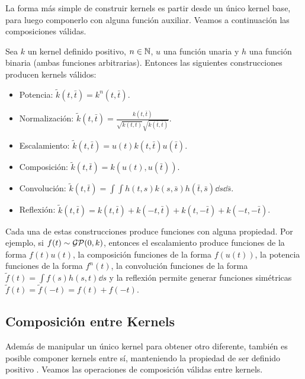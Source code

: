 La forma más simple de construir kernels es partir desde un único kernel base, para luego componerlo con alguna función auxiliar. Veamos a continuación las composiciones válidas.

\begin{proposition}
	Sea \(k\) un kernel definido positivo, \(n \in \mathbb{N}\), \(u\) una función unaria y \(h\) una función binaria (ambas funciones arbitrarias). Entonces las siguientes construcciones producen kernels válidos:
	\begin{itemize}
		\item Potencia: \(\tilde{k}(t, \bar{t}) = k^{n}(t, \bar{t})\).
		\item Normalización: \(\tilde{k}(t, \bar{t}) = \frac{k(t, \bar{t})}{\sqrt{k(t, t)} \sqrt{k(\bar{t}, \bar{t})}}\).
		\item Escalamiento: \(\tilde{k}(t, \bar{t}) = u(t) k(t, \bar{t}) u(\bar{t})\).
		\item Composición: \(\tilde{k}(t, \bar{t}) = k(u(t), u(\bar{t}))\).
		\item Convolución: \(\tilde{k}(t, \bar{t}) = \int \int h(t, s) k(s, \bar{s}) h(\bar{t}, \bar{s}) \dd{s} \dd{\bar{s}}\).
		\item Reflexión: \(\tilde{k}(t, \bar{t}) = k(t, \bar{t}) + k(-t, \bar{t}) + k(t, -\bar{t}) + k(-t, -\bar{t})\).
	\end{itemize}
\end{proposition}

Cada una de estas construcciones produce funciones con alguna propiedad. Por ejemplo, si \(f(t) \sim \operatorname{\mathcal{GP}}(0, k)\), entonces el escalamiento produce funciones de la forma \(f(t) u(t)\), la composición funciones de la forma \(f(u(t))\), la potencia funciones de la forma \(f^{n}(t)\), la convolución funciones de la forma \(\tilde{f}(t) = \int f(s) h(s, t) \dd{s}\) y la reflexión permite generar funciones simétricas \(\tilde{f}(t) = \tilde{f}(-t) = f(t) + f(-t)\).

\subsection{Composición entre Kernels}

Además de manipular un único kernel para obtener otro diferente, también es posible componer kernels entre sí, manteniendo la propiedad de ser definido positivo \cite{12} \cite{13}. Veamos las operaciones de
composición válidas entre kernels.

